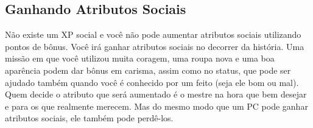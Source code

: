 \subsection{Ganhando Atributos Sociais}

Não existe um XP social e você não pode aumentar atributos sociais utilizando pontos de bônus. Você irá ganhar atributos sociais no decorrer da história. Uma missão em que você utilizou muita coragem, uma roupa nova e uma boa aparência podem dar bônus em carisma, assim como no status, que pode ser ajudado também quando você é conhecido por um feito (seja ele bom ou mal). Quem decide o atributo que será aumentado é o mestre na hora que bem desejar e para os que realmente merecem. Mas do mesmo modo que um PC pode ganhar atributos sociais, ele também pode perdê-los.	

   
